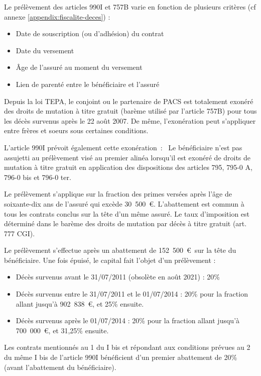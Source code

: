 \documentclass{article}
\newcommand{\blackFrame}[2]{
    \begin{tcolorbox}[colback=white,colframe=black!100!white,title={#1}]
        #2
    \end{tcolorbox}
}
\begin{document}
Le prélèvement des articles 990I et 757B varie en fonction de plusieurs critères (cf annexe \ref{appendix:fiscalite-deces}) :
\begin{itemize}
    \item Date de souscription (ou d'adhésion) du contrat
    \item Date du versement
    \item Âge de l'assuré au moment du versement
    \item Lien de parenté entre le bénéficiaire et l'assuré
\end{itemize}

\blackFrame{Exonération des prélèvements 757B et 990I}{
    Depuis la loi TEPA, le conjoint ou le partenaire de PACS est totalement exonéré des droits de mutation à titre gratuit (barème utilisé par l'article 757B) pour tous les décès survenus après le 22 août 2007. De même, l'exonération peut s'appliquer entre frères et soeurs sous certaines conditions.
    
    L'article 990I prévoit également cette exonération~: \og~Le bénéficiaire n'est pas assujetti au prélèvement visé au premier alinéa lorsqu'il est exonéré de droits de mutation à titre gratuit en application des dispositions des articles 795, 795-0 A, 796-0 bis et 796-0 ter.~\fg
}

\blackFrame{Article 757B}{
    Le prélèvement s'applique sur la fraction des primes versées après l'âge de soixante-dix ans de l'assuré qui excède 30~500~\euro. L'abattement est commun à tous les contrats conclus sur la tête d'un même assuré. Le taux d'imposition est déterminé dans le barème des droits de mutation par décès à titre gratuit (art. 777 CGI).
}

\blackFrame{Article 990I}{
    Le prélèvement s'effectue après un abattement de 152~500~\euro\ sur la tête du bénéficiaire. Une fois épuisé, le capital fait l'objet d'un prélèvement :
    \begin{itemize}
        \item Décès survenus avant le 31/07/2011 (obsolète en août 2021) : 20\%
        \item Décès survenus entre le 31/07/2011 et le 01/07/2014 : 20\% pour la fraction allant jusqu'à 902~838~\euro, et 25\% ensuite.
        \item Décès survenus après le 01/07/2014 : 20\% pour la fraction allant jusqu'à 700~000~\euro, et 31,25\% ensuite.
    \end{itemize}
    Les contrats mentionnés au 1 du I bis et répondant aux conditions prévues au 2 du même I bis de l'article 990I bénéficient d'un premier abattement de 20\% (avant l'abattement du bénéficiaire). 
}
\end{document}
